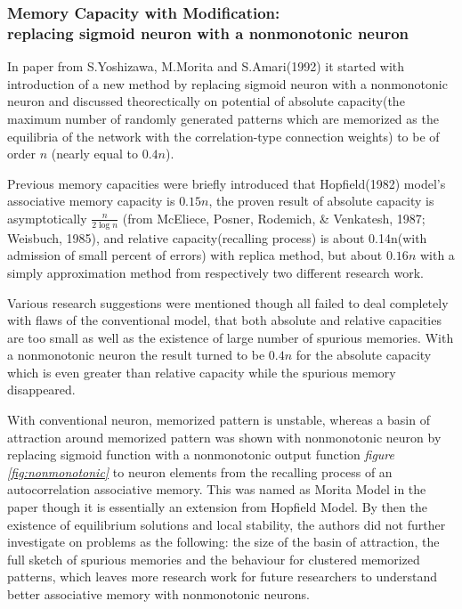 \subsubsection{Memory Capacity with Modification: \\ replacing sigmoid neuron with a nonmonotonic neuron}
In paper from S.Yoshizawa, M.Morita and S.Amari(1992) \cite{capacity_of_nonmonotonic_model} it started with introduction of a new method by replacing sigmoid neuron with a nonmonotonic neuron and discussed theorectically on potential of absolute capacity(the maximum number of randomly generated patterns which are memorized as the equilibria of the network with the correlation-type connection weights) to be of order $n$ (nearly equal to $0.4n$).

Previous memory capacities were briefly introduced that Hopfield(1982) model's associative memory capacity is $0.15n$, the proven result of absolute capacity is asymptotically $ \frac{n}{2\log{n}} $ (from McEliece, Posner, Rodemich, \& Venkatesh, 1987; Weisbuch, 1985), and relative capacity(recalling process) is about 0.14n(with admission of small percent of errors) with replica method, but about $0.16n$ with a simply approximation method from respectively two different research work.

Various research suggestions were mentioned though all failed to deal completely with flaws of the conventional model, that both absolute and relative capacities are too small as well as the existence of large number of spurious memories. With a nonmonotonic neuron the result turned to be $0.4n$ for the absolute capacity which is even greater than relative capacity while the spurious memory disappeared.

With conventional neuron, memorized pattern is unstable, whereas a basin of attraction around memorized pattern was shown with nonmonotonic neuron by replacing sigmoid function with a nonmonotonic output function \textit{figure \ref{fig:nonmonotonic}} to neuron elements from the recalling process of an autocorrelation associative memory. This was named as Morita Model in the paper though it is essentially an extension from Hopfield Model.
By then the existence of equilibrium solutions and local stability, the authors did not further investigate on problems as the following: the size of the basin of attraction, the full sketch of spurious memories and the behaviour for clustered memorized patterns, which leaves more research work for future researchers to understand better associative memory with nonmonotonic neurons.

